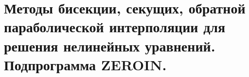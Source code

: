 \documentclass[../../calc-math-exam-2023.tex]{subfiles}
\begin{document}
    \section{Методы бисекции, секущих, обратной параболической интерполяции для решения нелинейных уравнений. Подпрограмма \textbf{ZEROIN}.}\label{sec:ch22}
\end{document}
